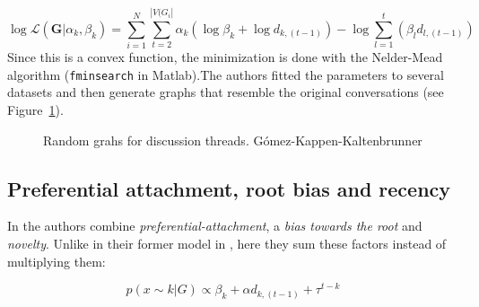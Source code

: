 \documentclass[smallextended]{svjour3}          %
\begin{document}
\begin{equation}
\log \mathcal{L}(\mathbf{G} | \alpha_k, \beta_k)
=
\sum_{i=1}^{N}
\sum_{t=2}^{|V(G_i|}
\alpha_k (\log \beta_k+ \log d_{k,(t-1)}) 
-
\log \sum_{l=1}^{t} (\beta_l d_{l,(t-1)})
\end{equation}
Since this is a convex function, the minimization is done with the Nelder-Mead algorithm (\texttt{fminsearch} in Matlab).The authors fitted the parameters to several datasets and then generate graphs that resemble the original conversations (see Figure~\ref{fig:Gomez}).

	\begin{figure}
		\centering
		\hfill
		\caption{Random grahs for discussion threads. Gómez-Kappen-Kaltenbrunner}
		\label{fig:Gomez}
	\end{figure}


\subsection{Preferential attachment, root bias and recency}
In \cite{Gomez2012a} the authors combine \textit{preferential-attachment}, a \textit{bias towards the root} and \textit{novelty}. Unlike in their former model in \cite{Gomez2010}, here they sum these factors instead of multiplying them:

\begin{equation}
p(x \sim k | G) 
\propto 
\beta_k + \alpha d_{k, (t-1)} + \tau^{t-k}
\end{equation}
\end{document}

